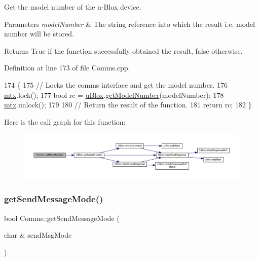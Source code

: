 Get the model number of the u-\/\+Blox device.


\begin{DoxyParams}{Parameters}
{\em model\+Number} & The string reference into which the result i.\+e. model number will be stored. \\
\hline
\end{DoxyParams}
\begin{DoxyReturn}{Returns}
True if the function successfully obtained the result, false otherwise. 
\end{DoxyReturn}


Definition at line 173 of file Comms.\+cpp.


\begin{DoxyCode}
174 \{
175     \textcolor{comment}{// Locks the comms interface and get the model number.}
176     \hyperlink{class_comms_a21df861b1202573e4cd0cb5666d638fe}{mtx}.lock();
177     \textcolor{keywordtype}{bool} rc = \hyperlink{class_comms_ac64dea134b116147e5441172346dbd6c}{uBlox}.\hyperlink{class_u_blox_ab9b9a03e10360c931686c1fe04af078d}{getModelNumber}(modelNumber);
178     \hyperlink{class_comms_a21df861b1202573e4cd0cb5666d638fe}{mtx}.unlock();
179 
180     \textcolor{comment}{// Return the result of the function.}
181     \textcolor{keywordflow}{return} rc;
182 \}
\end{DoxyCode}
Here is the call graph for this function\+:\nopagebreak
\begin{figure}[H]
\begin{center}
\leavevmode
\includegraphics[width=350pt]{d8/dcc/class_comms_a02eb048febea2d1a39a7fe9e064cf93c_cgraph}
\end{center}
\end{figure}
\mbox{\label{class_comms_ade9963ad1f934a79a6b584dd7abfe515}} 
\subsubsection{\texorpdfstring{get\+Send\+Message\+Mode()}{getSendMessageMode()}}
{\footnotesize\ttfamily bool Comms\+::get\+Send\+Message\+Mode (\begin{DoxyParamCaption}\item[{char \&}]{send\+Msg\+Mode }\end{DoxyParamCaption})}

